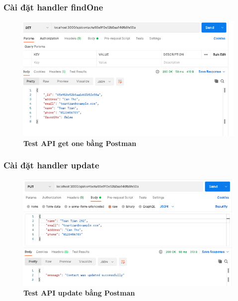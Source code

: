 \subsubsection*{Cài đặt handler findOne}
\begin{figure}[H]
  \centering
  \includegraphics[width=15cm]{images/chapterSecond/7.png}
  \caption{\bfseries Test API get one bằng Postman}
\end{figure}
\subsubsection*{Cài đặt handler update}
\begin{figure}[H]
  \centering
  \includegraphics[width=15cm]{images/chapterSecond/8.png}
  \caption{\bfseries Test API update bằng Postman}
\end{figure}
